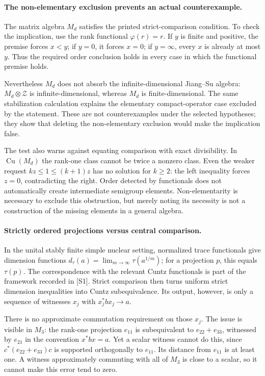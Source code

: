 \documentclass[11pt]{article}
\begin{document}
\paragraph{The non-elementary exclusion prevents an actual counterexample.}
The matrix algebra $M_d$ satisfies the printed strict-comparison
condition. To check the implication, use the rank functional
$\varphi(r)=r$. If $y$ is finite and positive, the premise forces
$x<y$; if $y=0$, it forces $x=0$; if $y=\infty$, every $x$ is
already at most $y$. Thus the required order conclusion holds
in every case in which the functional premise holds.

Nevertheless $M_d$ does not absorb the infinite-dimensional
Jiang--Su algebra: $M_d\otimes\mathcal Z$ is infinite-dimensional,
whereas $M_d$ is finite-dimensional. The same stabilization
calculation explains the elementary compact-operator case excluded
by the statement. These are not counterexamples under the selected
hypotheses; they show that deleting the non-elementary exclusion
would make the implication false.

The test also warns against equating comparison with exact
divisibility. In $\operatorname{Cu}(M_d)$ the rank-one class
cannot be twice a nonzero class. Even the weaker request
$kz\leq1\leq(k+1)z$ has no solution for $k\geq2$: the left
inequality forces $z=0$, contradicting the right. Order detected
by functionals does not automatically create intermediate
semigroup elements. Non-elementarity is necessary to exclude
this obstruction, but merely noting its necessity is not a
construction of the missing elements in a general algebra.

\paragraph{Strictly ordered projections versus central comparison.}
In the unital stably finite simple nuclear setting, normalized
trace functionals give dimension functions
$d_\tau(a)=\lim_{m\to\infty}\tau(a^{1/m})$; for a projection
$p$, this equals $\tau(p)$. The correspondence with the relevant
Cuntz functionals is part of the framework recorded in [S1].
Strict comparison then turns uniform strict dimension inequalities
into Cuntz subequivalence. Its output, however, is only a sequence
of witnesses $x_j$ with $x_j^*bx_j\to a$.

There is no approximate commutation requirement on those $x_j$.
The issue is visible in $M_3$: the rank-one projection $e_{11}$
is subequivalent to $e_{22}+e_{33}$, witnessed by $e_{21}$ in
the convention $x^*bx=a$. Yet a scalar witness cannot do this,
since $c^*(e_{22}+e_{33})c$ is supported orthogonally to $e_{11}$.
Its distance from $e_{11}$ is at least one. A witness approximately
commuting with all of $M_3$ is close to a scalar, so it cannot
make this error tend to zero.
\end{document}
